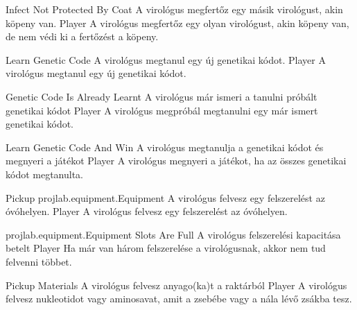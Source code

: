 \begin{use-case}
    {Infect Not Protected By Coat}
    {A virológus megfertőz egy másik virológust, akin köpeny van.}
    {Player}
    A virológus megfertőz egy olyan virológust, akin köpeny van, de nem védi ki a fertőzést a köpeny.
\end{use-case}

\begin{use-case}
    {Learn Genetic Code}
    {A virológus megtanul egy új genetikai kódot.}
    {Player}
    A virológus megtanul egy új genetikai kódot.
\end{use-case}

\begin{use-case}
    {Genetic Code Is Already Learnt}
    {A virológus már ismeri a tanulni próbált genetikai kódot}
    {Player}
    A virológus megpróbál megtanulni egy már ismert genetikai kódot.
\end{use-case}

\begin{use-case}
    {Learn Genetic Code And Win}
    {A virológus megtanulja a genetikai kódot és megnyeri a játékot}
    {Player}
    A virológus megnyeri a játékot, ha az összes genetikai kódot megtanulta.
\end{use-case}

\begin{use-case}
    {Pickup projlab.equipment.Equipment}
    {A virológus felvesz egy felszerelést az óvóhelyen.}
    {Player}
    A virológus felvesz egy felszerelést az óvóhelyen.
\end{use-case}

\begin{use-case}
    {projlab.equipment.Equipment Slots Are Full}
    {A virológus felszerelési kapacitása betelt}
    {Player}
    Ha már van három felszerelése a virológusnak, akkor nem tud felvenni többet.
\end{use-case}

\begin{use-case}
    {Pickup Materials}
    {A virológus felvesz anyago(ka)t a raktárból}
    {Player}
    A virológus felvesz nukleotidot vagy aminosavat, amit a zsebébe vagy a nála lévő zsákba tesz.
\end{use-case}

